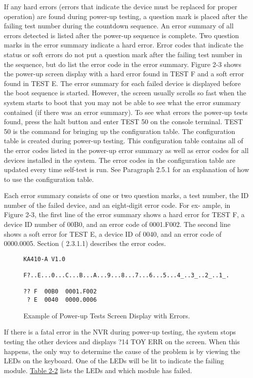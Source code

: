 If any hard errors (errors that indicate the device must be replaced for
proper operation) are found during power-up testing, a question mark is
placed after the failing test number during the countdown sequence. An
error summary of all errors detected is listed after the power-up sequence
is complete. Two question marks in the error summary indicate a hard error.
Error codes that indicate the status or soft errors do not put a question mark
after the failing test number in the sequence, but do list the error code in the
error summary. Figure 2-3 shows the power-up screen display with a hard
error found in TEST F and a soft error found in TEST E. The error summary
for each failed device is displayed before the boot sequence is started.
However, the screen usually scrolls so fast when the system starts to boot
that you may not be able to see what the error summary contained (if there
was an error summary). To see what errors the power-up tests found, press
the halt button and enter TEST 50 on the console terminal. TEST 50 is the
command for bringing up the configuration table. The configuration table
is created during power-up testing. This configuration table contains all of
the error codes listed in the power-up error summary as well as error codes
for all devices installed in the system. The error codes in the configuration
table are updated every time self-test is run. See Paragraph 2.5.1 for an
explanation of how to use the configuration table.

Each error summary consists of one or two question marks, a test number,
the ID number of the failed device, and an eight-digit error code. For ex-
ample, in Figure 2-3, the first line of the error summary shows a hard error
for TEST F, a device ID number of 00B0, and an error code of 0001.F002.
The second line shows a soft error for TEST E, a device ID of 0040, and an
error code of 0000.0005. Section ( 2.3.1.1) describes the error codes.
\newpage
\begin{figure}[H]
\caption{Example of Power-up Tests Screen Display with Errors.}
\begin{verbatim}
KA410-A V1.0

F?..E...0...C...B...A...9...8...7...6...5...4_..3_..2_..1_..

?? F  00B0  0001.F002
 ? E  0040  0000.0006
\end{verbatim}
\end{figure}
\label{figure:2-2}

If there is a fatal error in the NVR during power-up testing, the system stops
testing the other devices and displays ?14 TOY ERR on the screen. When
this happens, the only way to determine the cause of the problem is by
viewing the LEDs on the keyboard. One of the LEDs will be lit to indicate
the failing module. \hyperref[table:2-2]{Table 2-2} lists the LEDs and which module has failed.

